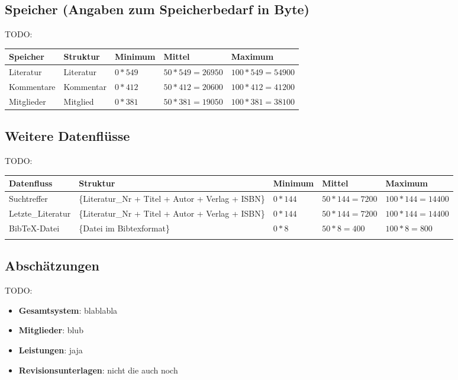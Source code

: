 \subsection{Speicher (Angaben zum Speicherbedarf in Byte)}
TODO:\\
\begin{tabular}[ht]{|l|l|l|l|l|}
\hline
Speicher & Struktur & Minimum & Mittel & Maximum \\
\hline\hline
Literatur & {Literatur} & $0*549$ & $50*549=26950$ & $100*549=54900$ \\
Kommentare & {Kommentar} & $0*412$ & $50*412=20600$ & $100*412=41200$ \\
Mitglieder & {Mitglied}  & $0*381$ & $50*381=19050$ & $100*381=38100$ \\
\hline
\end{tabular}

\subsection{Weitere Datenflüsse}
TODO:\\
\begin{tabular}[ht]{|l|p{3.2cm}|l|l|l|}
\hline
Datenfluss & Struktur & Minimum & Mittel & Maximum \\
\hline\hline

Suchtreffer & \{Literatur\_Nr + Titel + Autor + Verlag + ISBN\}  & $0*144$ & $50*144=7200$ & $100*144=14400$ \\
Letzte\_Literatur & \{Literatur\_Nr + Titel + Autor + Verlag + ISBN\}  & $0*144$ & $50*144=7200$ & $100*144=14400$ \\
BibTeX-Datei & \{Datei im Bibtexformat\} & $0*8$ & $50*8=400$ & $100*8=800$ \\
 
\\
\hline
\end{tabular}

\subsection{Abschätzungen}
TODO:
\begin{itemize}
 \item \textbf{Gesamtsystem}: blablabla
 \item \textbf{Mitglieder}: blub
 \item \textbf{Leistungen}: jaja
 \item \textbf{Revisionsunterlagen}: nicht die auch noch
\end{itemize}


